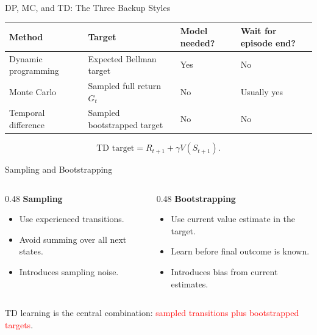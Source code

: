 \documentclass[aspectratio=169]{beamer}
\newcommand{\red}[1]{\textcolor{red}{#1}}
\begin{document}
\begin{frame}{DP, MC, and TD: The Three Backup Styles}
\small
\setlength{\tabcolsep}{4pt}
\begin{tabular}{>{\raggedright\arraybackslash}p{}
                >{\raggedright\arraybackslash}p{}
                >{\raggedright\arraybackslash}p{}
                >{\raggedright\arraybackslash}p{}}
\toprule
Method & Target & Model needed? & Wait for episode end? \\
\midrule
Dynamic programming & Expected Bellman target & Yes & No \\
Monte Carlo & Sampled full return $G_t$ & No & Usually yes \\
Temporal difference & Sampled bootstrapped target & No & No \\
\bottomrule
\end{tabular}

\vspace{1em}
\[
\text{TD target}=R_{t+1}+\gamma V(S_{t+1}).
\]
\end{frame}

\begin{frame}{Sampling and Bootstrapping}
\small
\begin{columns}[T,onlytextwidth]
\begin{column}{0.48\textwidth}
\textbf{Sampling}
\begin{itemize}
    \item Use experienced transitions.
    \item Avoid summing over all next states.
    \item Introduces sampling noise.
\end{itemize}
\end{column}
\begin{column}{0.48\textwidth}
\textbf{Bootstrapping}
\begin{itemize}
    \item Use current value estimate in the target.
    \item Learn before final outcome is known.
    \item Introduces bias from current estimates.
\end{itemize}
\end{column}
\end{columns}

\vspace{1em}
TD learning is the central combination: \red{sampled transitions plus bootstrapped targets}.
\end{frame}
\end{document}
